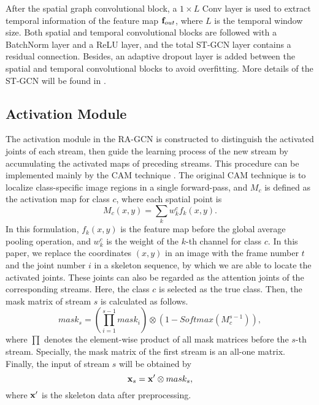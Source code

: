 \documentclass{article}
\begin{document}
After the spatial graph convolutional block, a $1\times L$ Conv layer is used to extract temporal information of the feature map ${\bf f}_{out}$, where $L$ is the temporal window size. Both spatial and temporal convolutional blocks are followed with a BatchNorm layer and a ReLU layer, and the total ST-GCN layer contains a residual connection. Besides, an adaptive dropout layer is added between the spatial and temporal convolutional blocks to avoid overfitting. More details of the ST-GCN will be found in \cite{Yan2018}.

\subsection{Activation Module}
\label{ssec:activation}

The activation module in the RA-GCN is constructed to distinguish the activated joints of each stream, then guide the learning process of the new stream by accumulating the activated maps of preceding streams. This procedure can be implemented mainly by the CAM technique \cite{Zhou2016}. The original CAM technique is to localize class-specific image regions in a single forward-pass, and $M_c$ is defined as the activation map for class $c$, where each spatial point is
\begin{equation}
M_c(x,y)=\sum_k w_k^c f_k(x,y).
\end{equation}
In this formulation, $f_k(x,y)$ is the feature map before the global average pooling operation, and $w_k^c$ is the weight of the $k$-th channel for class $c$. In this paper, we replace the coordinates $(x,y)$ in an image with the frame number $t$ and the joint number $i$ in a skeleton sequence, by which we are able to locate the activated joints. These joints can also be regarded as the attention joints of the corresponding streams. Here, the class $c$ is selected as the true class. Then, the mask matrix of stream $s$ is calculated as follows.
\begin{equation}
mask_s=(\prod_{i=1}^{s-1}mask_i)\otimes(1-Softmax(M_c^{s-1})),
\end{equation}
where $\prod$ denotes the element-wise product of all mask matrices before the $s$-th stream. Specially, the mask matrix of the first stream is an all-one matrix. Finally, the input of stream $s$ will be obtained by
\begin{equation}
\label{Eq:4}
{\bf x}_s={\bf x'}\otimes mask_s,
\end{equation}
where $\bf x'$ is the skeleton data after preprocessing. 
\end{document}
